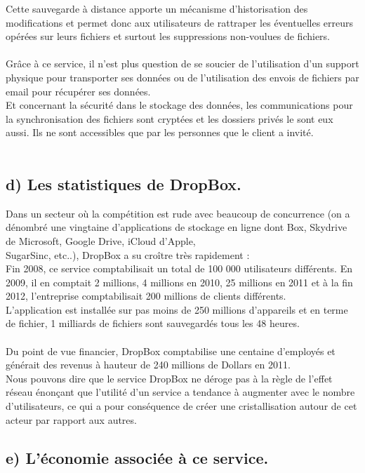\documentclass[a4paper, 10pt]{article}
\begin{document}
Cette sauvegarde à distance apporte un mécanisme d'historisation des modifications et 
permet donc aux utilisateurs de rattraper les éventuelles erreurs opérées sur leurs fichiers et
surtout les suppressions non-voulues de fichiers.\\ \\
Grâce à ce service, il n'est plus question de se soucier de l'utilisation d'un support physique pour transporter ses données
ou de l'utilisation des envois de fichiers par email pour récupérer ses données.\\
Et concernant la sécurité dans le stockage des données, les communications pour la synchronisation des fichiers sont cryptées et
les dossiers privés le sont eux aussi. Ils ne sont accessibles que par les personnes que le client a invité.\\ \\

\subsection*{d) Les statistiques de DropBox.}
\indent

Dans un secteur où la compétition est rude avec beaucoup de concurrence
(on a dénombré une vingtaine d'applications de stockage en ligne dont Box, Skydrive de Microsoft, Google Drive, iCloud d'Apple,\\SugarSinc,
etc..), DropBox a su croître très rapidement :\\
Fin 2008, ce service comptabilisait un total de 100 000 utilisateurs différents.
En 2009, il en comptait 2 millions, 4 millions en 2010, 25 millions en 2011 et
à la fin 2012, l'entreprise comptabilisait 200 millions de clients différents.\\
L'application est installée sur pas moins de 250 millions d'appareils et
en terme de fichier, 1 milliards de fichiers sont sauvegardés tous les 48 heures.\\ \\
Du point de vue financier, DropBox comptabilise une centaine d'employés et générait des revenus à hauteur
de 240 millions de Dollars en 2011.\\
Nous pouvons dire que le service DropBox ne déroge pas à la règle de l'effet réseau énonçant que l'utilité d'un service
a tendance à augmenter avec le nombre d'utilisateurs, ce qui a pour conséquence de créer une cristallisation autour de cet acteur
par rapport aux autres.
\newpage

\subsection*{e) L'économie associée à ce service.}
\indent
\end{document}
